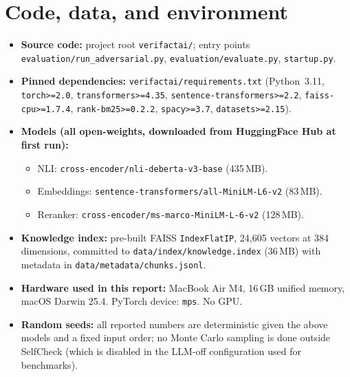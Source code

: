 \documentclass[12pt, a4paper, oneside]{report}
\begin{document}
\section{Code, data, and environment}
\begin{itemize}[nosep]
    \item \textbf{Source code:} project root \texttt{verifactai/}; entry points \texttt{evaluation/run\_adversarial.py}, \texttt{evaluation/evaluate.py}, \texttt{startup.py}.
    \item \textbf{Pinned dependencies:} \texttt{verifactai/requirements.txt} (Python~3.11, \texttt{torch>=2.0}, \texttt{transformers>=4.35}, \texttt{sentence-transformers>=2.2}, \texttt{faiss-cpu>=1.7.4}, \texttt{rank-bm25>=0.2.2}, \texttt{spacy>=3.7}, \texttt{datasets>=2.15}).
    \item \textbf{Models (all open-weights, downloaded from HuggingFace Hub at first run):}
    \begin{itemize}[nosep]
        \item NLI: \texttt{cross-encoder/nli-deberta-v3-base} (435\,MB).
        \item Embeddings: \texttt{sentence-transformers/all-MiniLM-L6-v2} (83\,MB).
        \item Reranker: \texttt{cross-encoder/ms-marco-MiniLM-L-6-v2} (128\,MB).
    \end{itemize}
    \item \textbf{Knowledge index:} pre-built FAISS \texttt{IndexFlatIP}, 24{,}605 vectors at 384 dimensions, committed to \texttt{data/index/knowledge.index} (36\,MB) with metadata in \texttt{data/metadata/chunks.jsonl}.
    \item \textbf{Hardware used in this report:} MacBook Air M4, 16\,GB unified memory, macOS Darwin 25.4. PyTorch device: \texttt{mps}. No GPU.
    \item \textbf{Random seeds:} all reported numbers are deterministic given the above models and a fixed input order; no Monte Carlo sampling is done outside SelfCheck (which is disabled in the LLM-off configuration used for benchmarks).
\end{itemize}
\end{document}
